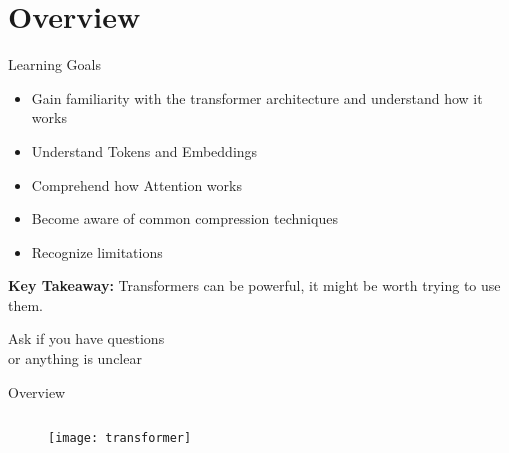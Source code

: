 \section{Overview}

\begin{frame}[c]{Learning Goals} 
    \large
    \begin{itemize}[<+(1)->]
        \item Gain familiarity with the transformer architecture and understand how it works
        \item Understand Tokens and Embeddings
        \item Comprehend how Attention works
        \item Become aware of common compression techniques
        \item Recognize limitations
    \end{itemize}
    \pause
    \textbf{Key Takeaway:} Transformers can be powerful, it might be worth
    trying to use them.
\end{frame}

\addtocounter{framenumber}{1}
\begin{frame}[standout]
    \huge
    Ask if you have questions \\
    or anything is unclear
\end{frame}

\begin{frame}[c]{Overview}
    \begin{figure}
        \begin{columns}
            \texttt{[image: transformer]}
        \end{columns}
    \end{figure}
\end{frame}
